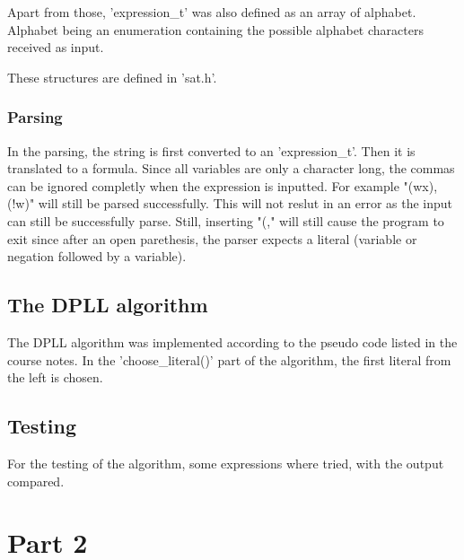 \documentclass[a4paper, 12pt]{article}
\begin{document}
Apart from those, 'expression\_t' was also defined as an array of alphabet. Alphabet being an enumeration
containing the possible alphabet characters received as input.

These structures are defined in 'sat.h'.

\subsubsection{Parsing}
In the parsing, the string is first converted to an 'expression\_t'. Then it is translated to a formula. Since all variables are 
only a character long, the commas can be ignored completly when the expression is inputted. For example "(wx), (!w)" will still be parsed successfully. 
This will not reslut in an error as the input can still be successfully parse. 
Still, inserting "(," will still cause the program to exit since after an open parethesis, 
the parser expects a literal (variable or negation followed by a variable).

\subsection{The DPLL algorithm}
The DPLL algorithm was implemented according to the pseudo code listed in the course notes. In the 'choose\_literal()' part of the algorithm,
the first literal from the left is chosen.

\subsection{Testing}
For the testing of the algorithm, some expressions where tried, with the output compared.


\section{Part 2}
\end{document}
